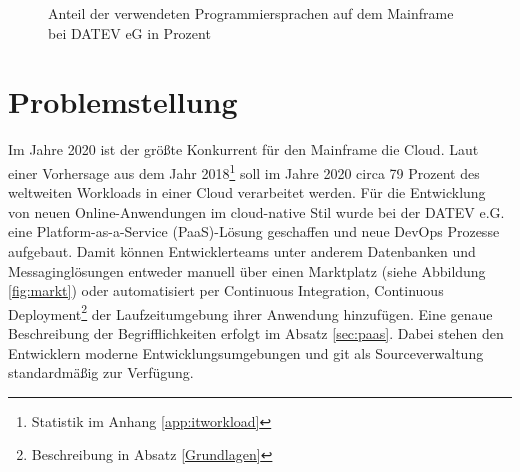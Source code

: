 \begin{figure}
\centering
\caption{Anteil der verwendeten Programmiersprachen auf dem Mainframe bei DATEV eG in Prozent}
\label{fig:Programmiersprachen}
\end{figure}

\section{Problemstellung}\label{sec:probstell}
Im Jahre 2020 ist der größte Konkurrent für den Mainframe die Cloud.
Laut einer Vorhersage aus dem Jahr 2018\footnote{Statistik im Anhang \ref{app:itworkload}} soll im Jahre 2020 circa 79 Prozent des weltweiten Workloads in einer Cloud verarbeitet werden.
Für die Entwicklung von neuen Online-Anwendungen im cloud-native Stil wurde bei der DATEV e.G. eine Platform-as-a-Service (PaaS)-Lösung geschaffen und neue DevOps Prozesse aufgebaut. 
Damit können Entwicklerteams unter anderem Datenbanken und Messaginglösungen entweder manuell über einen Marktplatz (siehe Abbildung \ref{fig:markt}) oder automatisiert per \glqq Continuous Integration, Continuous Deployment\grqq{}\footnote{Beschreibung in Absatz \ref{Grundlagen}} der Laufzeitumgebung ihrer Anwendung hinzufügen.
Eine genaue Beschreibung der Begrifflichkeiten erfolgt im Absatz \ref{sec:paas}.
Dabei stehen den Entwicklern moderne Entwicklungsumgebungen und git als Sourceverwaltung standardmäßig zur Verfügung.

